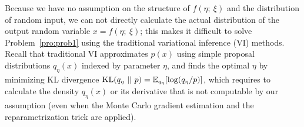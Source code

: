 \documentclass{article} %
\begin{document}
Because we have no assumption on the structure of $f(\eta;~\xi)$ 
and the distribution of random input,
we can not directly calculate the actual distribution of the output random variable $x = f(\eta;~\xi)$; 
this makes it difficult to solve Problem~\ref{pro:prob1} using the traditional variational inference (VI) methods. 
Recall that traditional VI approximates $p(x)$ using simple proposal distributions $q_\eta(x)$ indexed by parameter $\eta$, 
and finds the optimal $\eta$ by minimizing KL divergence $\mathrm{KL}(q_\eta ~||~p) = \mathbb{E}_{q_\eta}[\log (q_\eta/p)]$, 
which requires to calculate the density $q_\eta(x)$ or its derivative that is not computable by our assumption 
(even when the Monte Carlo gradient estimation and the reparametrization trick \citep{kingma2013auto} are applied).  

\begin{comment}
\begin{figure}[t]
   \centering
   \scalebox{1}{
   \texttt{[image: figures/neuralsampler1]}%
   }
   \begin{picture}(0,0)(0,0)
   \put(-250,-10){\figcapsize \emph{Given distribution}}
      \put(-170,-10){{\figcapsize \emph{Black-box neural sampler}}}
   \put(-50,-10){\figcapsize \emph{Samples}}
   \end{picture}\\[.5em]
   \caption{\figcapsize   
   Our methods ``learn to draw samples'',  
   constructing black-box neural samplers for given distributions. 
   It allows us to automatize the hyper-parameter tuning of Bayesian inference, 
 speed up the inference inner loops of learning algorithms, 
and eventually replace hand-designed inference algorithms with more efficiently one that is trained on past tasks and is improved adaptively over time.}
   \label{fig:example}
\end{figure}
\end{comment}
\end{document}
